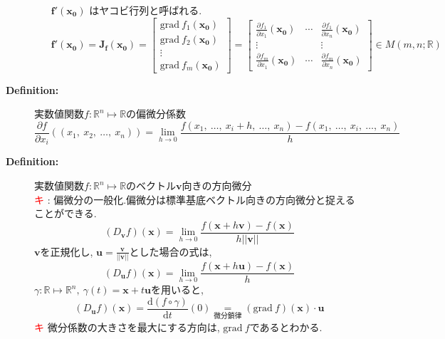 \documentclass[dvipdfmx]{jsarticle}
\newcommand{\point}{\textcircled{\textcolor{red}{\scriptsize キ}} }
\begin{document}
\begin{description}
\begin{itemize}
                        $\bm{f'}(\bm{x_0})$ はヤコビ行列と呼ばれる.
                        $$\bm{f'}(\bm{x_0}) = \bm{J_f}(\bm{x_0}) = 
                        \begin{bmatrix}
                            \mathrm{grad} \ f_1(\bm{x_0}) \\
                            \mathrm{grad} \ f_2(\bm{x_0}) \\
                                \vdots \\
                            \mathrm{grad} \ f_m(\bm{x_0})
                        \end{bmatrix}
                        = 
                        \begin{bmatrix}
                            \frac{\partial f_1}{\partial x_1}(\bm{x_0}) & \cdots & \frac{\partial f_1}{\partial x_n}(\bm{x_0}) \\
                            \vdots & & \vdots \\
                            \frac{\partial f_m}{\partial x_1}(\bm{x_0}) & \cdots & \frac{\partial f_m}{\partial x_n}(\bm{x_0})
                        \end{bmatrix} \in M(m,n; \mathbb{R})$$
                \end{itemize}
        
        \item[\bf{Definition:}] 実数値関数$f : \mathbb{R}^n \mapsto \mathbb{R}$の偏微分係数 \\
            $$ \frac{\partial f}{\partial x_i}((x_1,\ x_2,\ \dots,\ x_n)) = \lim_{h \to 0} \dfrac{f(x_1,\ \dots ,\ x_i + h,\ \dots ,\ x_n) - f(x_1,\ \dots ,\ x_i,\ \dots ,\ x_n)}{h}$$

        \item[\bf{Definition:}] 実数値関数$f : \mathbb{R}^n \mapsto \mathbb{R}$のベクトル$\bm{v}$向きの方向微分 \\
            \point : 偏微分の一般化.偏微分は標準基底ベクトル向きの方向微分と捉えることができる.
            $$ (D_{\bm{v}}f)(\bm{x}) = \lim_{h \to 0} \dfrac{f(\bm{x} + h\bm{v})-f(\bm{x})}{h||\bm{v}||}$$
            $\bm{v}$を正規化し, $\bm{u} = \frac{\bm{v}}{||\bm{v}||}$とした場合の式は, 
            $$ (D_{\bm{u}}f)(\bm{x}) = \lim_{h \to 0} \dfrac{f(\bm{x} + h\bm{u})-f(\bm{x})}{h}$$
            $\gamma : \mathbb{R} \mapsto \mathbb{R}^n,\ \gamma (t) = \bm{x} + t \bm{u}$を用いると, 
            $$ (D_{\bm{u}}f)(\bm{x}) = \frac{\mathrm{d} (f \circ \gamma)}{\mathrm{d} t}(0) \underset{微分鎖律}{=} (\mathrm{grad} \ f)(\bm{x}) \cdot \bm{u}$$
            \point 微分係数の大きさを最大にする方向は, $\mathrm{grad} \ f$であるとわかる.
    

\end{description}
\end{document}
